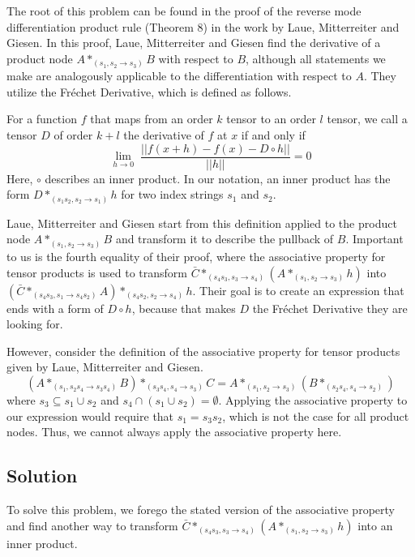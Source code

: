 \documentclass[12pt, a4paper]{report} %
\begin{document}
The root of this problem can be found in the proof of the reverse mode differentiation product rule (Theorem 8) in the work \cite{tensorpaper} by Laue, Mitterreiter and Giesen.
In this proof, Laue, Mitterreiter and Giesen find the derivative of a product node $A *_{(s_1, s_2 \rightarrow s_3)} B$ with respect to $B$, although all statements we make are analogously applicable to the differentiation with respect to $A$.
They utilize the Fr\'{e}chet Derivative, which is defined as follows.

For a function $f$ that maps from an order $k$ tensor to an order $l$ tensor, we call a tensor $D$ of order $k+l$ the derivative of $f$ at $x$ if and only if
$$
\lim_{h \rightarrow 0} \; \frac{||f(x+h) - f(x) - D \circ h||}{||h||} = 0
$$
Here, $\circ$ describes an inner product.
In our notation, an inner product has the form $D *_{(s_1 s_2, s_2 \rightarrow s_1)} h$ for two index strings $s_1$ and $s_2$.

Laue, Mitterreiter and Giesen start from this definition applied to the product node $A *_{(s_1, s_2 \rightarrow s_3)} B$ and transform it to describe the pullback of $B$.
Important to us is the fourth equality of their proof, where the associative property for tensor products is used to transform $\bar{C} *_{(s_4s_3,s_3 \rightarrow s_4)} (A *_{(s_1,s_2 \rightarrow s_3)} h)$ into $(\bar{C} *_{(s_4s_3,s_1 \rightarrow s_4s_2)} A) *_{(s_4s_2,s_2 \rightarrow s_4)} h$.
Their goal is to create an expression that ends with a form of $D \circ h$, because that makes $D$ the Fr\'{e}chet Derivative they are looking for.

However, consider the definition of the associative property for tensor products given by Laue, Mitterreiter and Giesen.
$$
(A *_{(s_1, s_2 s_4 \rightarrow s_3 s_4)} B) *_{(s_3 s_4, s_4 \rightarrow s_3)} C = A *_{(s_1, s_2 \rightarrow s_3)} (B *_{(s_2 s_4, s_4 \rightarrow s_2)})
$$
where $s_3 \subseteq s_1 \cup s_2$ and $s_4 \cap (s_1 \cup s_2) = \emptyset$. 
Applying the associative property to our expression would require that $s_1 = s_3 s_2$, which is not the case for all product nodes.
Thus, we cannot always apply the associative property here.

\subsection{Solution}
To solve this problem, we forego the stated version of the associative property and find another way to transform $\bar{C} *_{(s_4s_3,s_3 \rightarrow s_4)} (A *_{(s_1,s_2 \rightarrow s_3)} h)$ into an inner product.
\end{document}
